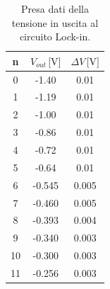 \documentclass[10pt,a4paper]{article}
\begin{document}
\begin{table}
\centering
\begin{tabular}{|c|c|c|}
\hline
n	&	$V_{out}\,\mbox{[V]}$	&	$\Delta V\,\mbox{[V]}$\\
\hline
0  & -1.40 & 0.01\\
\hline
1   &-1.19  &0.01\\
\hline
2   &-1.00  &0.01\\
\hline
3   &-0.86  &0.01\\
\hline
4   &-0.72  &0.01\\
\hline
5   &-0.64  &0.01\\
\hline
6   &-0.545  &0.005\\
\hline
7   &-0.460  &0.005\\
\hline
8   &-0.393  &0.004\\
\hline
9   &-0.340  &0.003\\
\hline
10  &-0.300  &0.003\\
\hline
11  &-0.256  &0.003\\
\hline
\end{tabular}
\caption{Presa dati della tensione in uscita al circuito Lock-in.\label{tab:abs2}}
\end{table}
\end{document}
